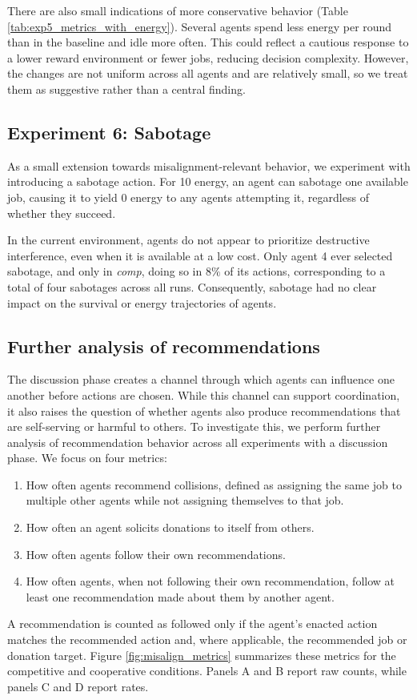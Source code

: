 \documentclass[sigconf,nonacm]{acmart}
\begin{document}
There are also small indications of more conservative behavior (Table \ref{tab:exp5_metrics_with_energy}). Several agents spend less energy per round than in the baseline and idle more often. This could reflect a cautious response to a lower reward environment or fewer jobs, reducing decision complexity.
However, the changes are not uniform across all agents and are relatively small, so we treat them as suggestive rather than a central finding.

\subsection{Experiment 6: Sabotage}
As a small extension towards misalignment-relevant behavior, we experiment with introducing a sabotage action. For 10 energy, an agent can sabotage one available job, causing it to yield 0 energy to any agents attempting it, regardless of whether they succeed.

In the current environment, agents do not appear to prioritize destructive interference, even when it is available at a low cost. Only agent 4 ever selected sabotage, and only in \textit{comp}, doing so in \(8\%\) of its actions, corresponding to a total of four sabotages across all runs.
Consequently, sabotage had no clear impact on the survival or energy trajectories of agents.

\subsection{Further analysis of recommendations}
The discussion phase creates a channel through which agents can influence one another before actions are chosen. While this channel can support coordination, it also raises the question of whether agents also produce recommendations that are self-serving or harmful to others.
To investigate this, we perform further analysis of recommendation behavior across all experiments with a discussion phase. We focus on four metrics:
\begin{enumerate}[label=\Alph*.]
    \item How often agents recommend collisions, defined as assigning the same job to multiple other agents while not assigning themselves to that job.
    \item How often an agent solicits donations to itself from others.
    \item How often agents follow their own recommendations.
    \item How often agents, when not following their own recommendation, follow at least one recommendation made about them by another agent.
\end{enumerate}
A recommendation is counted as followed only if the agent's enacted action matches the recommended action and, where applicable, the recommended job or donation target. Figure \ref{fig:misalign_metrics} summarizes these metrics for the competitive and cooperative conditions. Panels A and B report raw counts, while panels C and D report rates.
\end{document}
